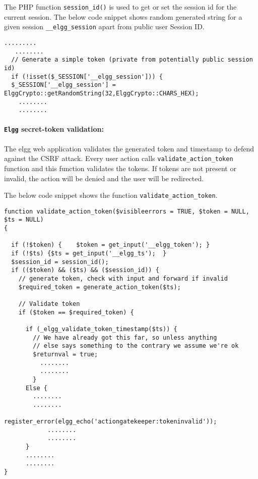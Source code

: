 The PHP function {\tt session\_id()} is used to get or set the session id for the current session. 
The below code snippet shows random generated string for a given session {\tt\_\_elgg\_session} apart from public user Session ID.

{\footnotesize
\begin{Verbatim}[frame=single]
   .........
   ........
  // Generate a simple token (private from potentially public session id)
  if (!isset($_SESSION['__elgg_session'])) {
  $_SESSION['__elgg_session'] = ElggCrypto::getRandomString(32,ElggCrypto::CHARS_HEX);
	........
	........

\end{Verbatim}
}

\paragraph{{\tt Elgg} secret-token validation:}

 
The elgg web application validates the generated token and timestamp to defend against the CSRF attack.
Every user action calls {\tt validate\_action\_token} function and this function validates the tokens. 
If tokens are not present or invalid, the action will be denied and the user will be redirected.
 
 
The below code snippet shows the function {\tt validate\_action\_token}.

{\footnotesize
\begin{Verbatim}[frame=single]
function validate_action_token($visibleerrors = TRUE, $token = NULL, $ts = NULL) 
{

  if (!$token) {	$token = get_input('__elgg_token');	}
  if (!$ts) {$ts = get_input('__elgg_ts');	}
  $session_id = session_id();
  if (($token) && ($ts) && ($session_id)) {
    // generate token, check with input and forward if invalid
    $required_token = generate_action_token($ts);

    // Validate token
    if ($token == $required_token) {
			
      if (_elgg_validate_token_timestamp($ts)) {
        // We have already got this far, so unless anything
        // else says something to the contrary we assume we're ok
        $returnval = true;
          ........
          ........
        }
      Else {     
	    ........
	    ........
            register_error(elgg_echo('actiongatekeeper:tokeninvalid'));
            ........
            ........
      }
      ........
      ........
}
\end{Verbatim}
}

